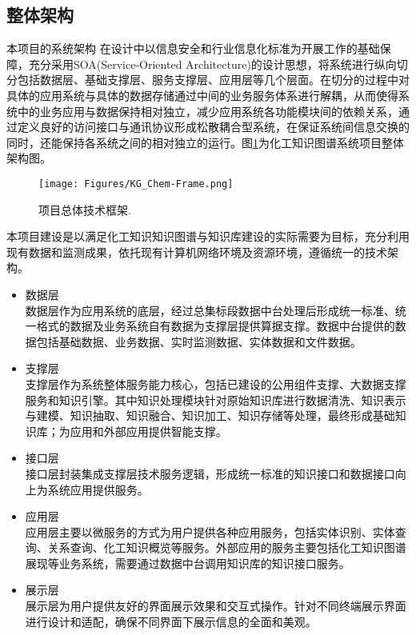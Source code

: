\subsection{整体架构} 
本项目的系统架构%
在设计中以信息安全和行业信息化标准为开展工作的基础保障，充分采用\textrm{SOA(Service-Oriented Architecture)}的设计思想，将系统进行纵向切分包括数据层、基础支撑层、服务支撑层、应用层等几个层面。在切分的过程中对具体的应用系统与具体的数据存储通过中间的业务服务体系进行解耦，从而使得系统中的业务应用与数据保持相对独立，减少应用系统各功能模块间的依赖关系，通过定义良好的访问接口与通讯协议形成松散耦合型系统，在保证系统间信息交换的同时，还能保持各系统之间的相对独立的运行。图\ref{KG_Chem-Frame}为化工知识图谱系统项目整体架构图。
\begin{figure}[h!]
\centering
\texttt{[image: Figures/KG\_Chem-Frame.png]}
\caption{项目总体技术框架.}%
\label{KG_Chem-Frame}
\end{figure} 

本项目建设是以满足化工知识知识图谱与知识库建设的实际需要为目标，充分利用现有数据和监测成果，依托现有计算机网络环境及资源环境，遵循统一的技术架构。
\begin{itemize}
	\item 数据层\\ 
数据层作为应用系统的底层，经过总集标段数据中台处理后形成统一标准、统一格式的数据及业务系统自有数据为支撑层提供算据支撑。数据中台提供的数据包括基础数据、业务数据、实时监测数据、实体数据和文件数据。
\item 支撑层\\ 
支撑层作为系统整体服务能力核心，包括已建设的公用组件支撑、大数据支撑服务和知识引擎。其中知识处理模块针对原始知识库进行数据清洗、知识表示与建模、知识抽取、知识融合、知识加工、知识存储等处理，最终形成基础知识库；为应用和外部应用提供智能支撑。
\item 接口层\\ 
接口层封装集成支撑层技术服务逻辑，形成统一标准的知识接口和数据接口向上为系统应用提供服务。
\item 应用层\\ 
应用层主要以微服务的方式为用户提供各种应用服务，包括实体识别、实体查询、关系查询、化工知识概览等服务。外部应用的服务主要包括化工知识图谱展现等业务系统，需要通过数据中台调用知识库的知识接口服务。
\item 展示层\\
展示层为用户提供友好的界面展示效果和交互式操作。针对不同终端展示界面进行设计和适配，确保不同界面下展示信息的全面和美观。 
\end{itemize}

